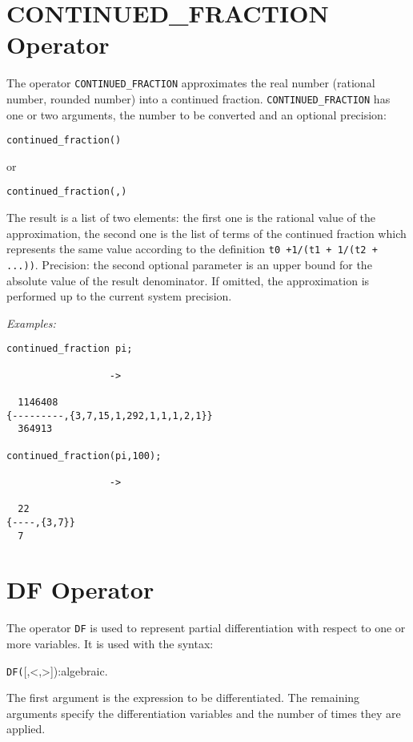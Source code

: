 \section{CONTINUED\_FRACTION Operator}
\hypertarget{operator:CONTINUED_FRACTION}{}

The operator \texttt{CONTINUED\_FRACTION} 
approximates the real number 
(rational number, rounded number)
into a continued fraction. \texttt{CONTINUED\_FRACTION} has one or
two arguments, the number to be converted and an optional
precision:
\begin{syntaxtable}
    \texttt{continued\_fraction(}\texttt{)} 
\end{syntaxtable}
or
\begin{syntaxtable}
    \texttt{continued\_fraction(}\texttt{,}\texttt{)}
\end{syntaxtable}
The result is a list of two elements: the
first one is the rational value of the approximation, the second one
is the list of terms of the continued fraction which represents the
same value according to the definition \texttt{t0 +1/(t1 + 1/(t2 + ...))}.
Precision: the second optional parameter  is an upper bound
for the absolute value of the result denominator. If omitted, the
approximation is performed up to the current system precision.

\textit{Examples:}
\begin{verbatim}
continued_fraction pi;

                  ->

  1146408
{---------,{3,7,15,1,292,1,1,1,2,1}}
  364913

continued_fraction(pi,100);

                  ->

  22
{----,{3,7}}
  7

\end{verbatim}


\section{DF Operator}
\label{sec:DF-operator}
\hypertarget{operator:DF}{}
The operator \texttt{DF} is used to represent partial
differentiation with respect
to one or more variables. It is used with the syntax:
\begin{syntax}
     \texttt{DF(}[,<,>]):algebraic.
\end{syntax}
The first argument is the expression to be differentiated. The remaining
arguments specify the differentiation variables and the number of times
they are applied.

